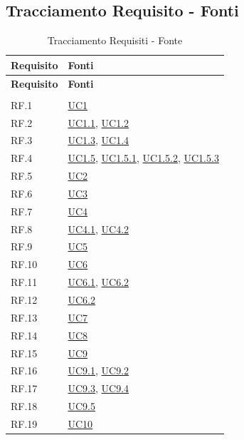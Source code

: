 \documentclass[12pt, a4paper]{article}
\begin{document}
\subsection{Tracciamento Requisito - Fonti}

\begin{longtable}{|l|p{}|}
\hline
\textbf{Requisito} & \textbf{Fonti} \\
\hline
\endfirsthead

\hline
\textbf{Requisito} & \textbf{Fonti} \\
\hline
\endhead

\hline
\endfoot

\hline
\caption{Tracciamento Requisiti - Fonte}
\label{tab:tracciamento_r-f} \\          
\endlastfoot

RF.1 & \hyperref[uc:1]{UC1} \\ \hline
RF.2 & \hyperref[uc:1.1]{UC1.1}, \hyperref[uc:1.2]{UC1.2} \\ \hline
RF.3 & \hyperref[uc:1.3]{UC1.3}, \hyperref[uc:1.4]{UC1.4} \\ \hline
RF.4 & \hyperref[uc:1.5]{UC1.5}, \hyperref[uc:1.5.1]{UC1.5.1}, \hyperref[uc:1.5.2]{UC1.5.2}, \hyperref[uc:1.5.3]{UC1.5.3} \\ \hline
RF.5 & \hyperref[uc:2]{UC2} \\ \hline
RF.6 & \hyperref[uc:3]{UC3} \\ \hline
RF.7 & \hyperref[uc:4]{UC4} \\ \hline
RF.8 & \hyperref[uc:4.1]{UC4.1}, \hyperref[uc:4.2]{UC4.2} \\ \hline
RF.9 & \hyperref[uc:5]{UC5} \\ \hline
RF.10 & \hyperref[uc:6]{UC6} \\ \hline
RF.11 & \hyperref[uc:6.1]{UC6.1}, \hyperref[uc:6.2]{UC6.2} \\ \hline
RF.12 & \hyperref[uc:6.2]{UC6.2} \\ \hline
RF.13 & \hyperref[uc:7]{UC7} \\ \hline
RF.14 & \hyperref[uc:8]{UC8} \\ \hline
RF.15 & \hyperref[uc:9]{UC9} \\ \hline
RF.16 & \hyperref[uc:9.1]{UC9.1}, \hyperref[uc:9.2]{UC9.2} \\ \hline
RF.17 & \hyperref[uc:9.3]{UC9.3}, \hyperref[uc:9.4]{UC9.4} \\ \hline
RF.18 & \hyperref[uc:9.5]{UC9.5} \\ \hline
RF.19 & \hyperref[uc:10]{UC10} \\ \hline

\end{longtable}
\end{document}
